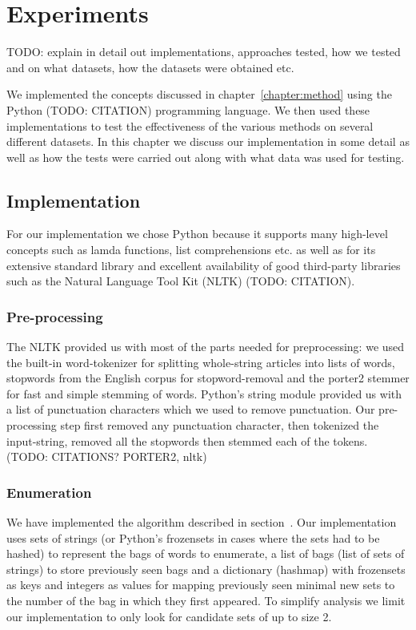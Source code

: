\chapter{Experiments}
\label{chapter:experiments}
TODO: explain in detail out implementations, approaches tested, how we tested and on what datasets, how the datasets were obtained etc.

We implemented the concepts discussed in chapter~\ref{chapter:method} using the Python (TODO: CITATION) programming language. We then used these implementations to test the effectiveness of the various methods on several different datasets. In this chapter we discuss our implementation in some detail as well as how the tests were carried out along with what data was used for testing.

\section{Implementation}
For our implementation we chose Python because it supports many high-level concepts such as lamda functions, list comprehensions etc. as well as for its extensive standard library and excellent availability of good third-party libraries such as the Natural Language Tool Kit (NLTK) (TODO: CITATION).

\subsection{Pre-processing}
The NLTK provided us with most of the parts needed for preprocessing: we used the built-in word-tokenizer for splitting whole-string articles into lists of words,  stopwords from the English corpus for stopword-removal and the porter2 stemmer for fast and simple stemming of words. Python's string module provided us with a list of punctuation characters which we used to remove punctuation. Our pre-processing step first removed any punctuation character, then tokenized the input-string, removed all the stopwords then stemmed each of the tokens. (TODO: CITATIONS? PORTER2, nltk)

\subsection{Enumeration}
We have implemented the algorithm described in section~\label{method:enumeration}. Our implementation uses sets of strings (or Python's frozensets in cases where the sets had to be hashed) to represent the bags of words to enumerate, a list of bags (list of sets of strings) to store previously seen bags and a dictionary (hashmap) with frozensets as keys and integers as values for mapping previously seen minimal new sets to the number of the bag in which they first appeared. To simplify analysis we limit our implementation to only look for candidate sets of up to size 2.

